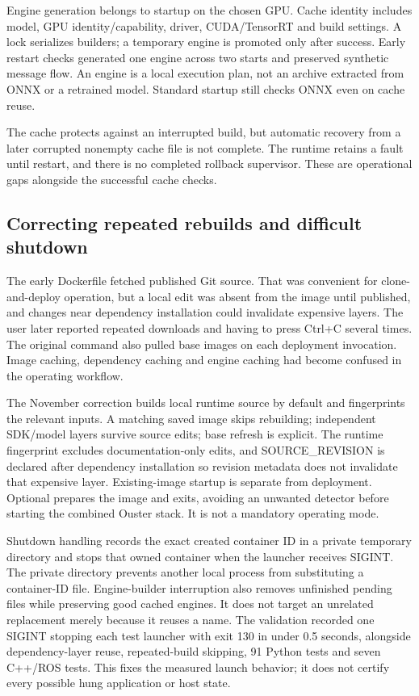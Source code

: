 \documentclass[11pt,a4paper]{article}
\newcommand{\code}[1]{\texttt{\detokenize{#1}}}
\begin{document}
Engine generation belongs to startup on the chosen GPU. Cache identity includes model, GPU identity/capability, driver, CUDA/TensorRT and build settings. A lock serializes builders; a temporary engine is promoted only after success. Early restart checks generated one engine across two starts and preserved synthetic message flow. An engine is a local execution plan, not an archive extracted from ONNX or a retrained model. Standard startup still checks ONNX even on cache reuse.

The cache protects against an interrupted build, but automatic recovery from a later corrupted nonempty cache file is not complete. The runtime retains a fault until restart, and there is no completed rollback supervisor. These are operational gaps alongside the successful cache checks.

\subsection{Correcting repeated rebuilds and difficult shutdown}

The early Dockerfile fetched published Git source. That was convenient for clone-and-deploy operation, but a local edit was absent from the image until published, and changes near dependency installation could invalidate expensive layers. The user later reported repeated downloads and having to press Ctrl+C several times. The original command also pulled base images on each deployment invocation. Image caching, dependency caching and engine caching had become confused in the operating workflow.

The November correction builds local runtime source by default and fingerprints the relevant inputs. A matching saved image skips rebuilding; independent SDK/model layers survive source edits; base refresh is explicit. The runtime fingerprint excludes documentation-only edits, and SOURCE\_REVISION is declared after dependency installation so revision metadata does not invalidate that expensive layer. Existing-image startup is separate from deployment. Optional \code{PP_BUILD_ONLY=1} prepares the image and exits, avoiding an unwanted detector before starting the combined Ouster stack. It is not a mandatory operating mode.

Shutdown handling records the exact created container ID in a private temporary directory and stops that owned container when the launcher receives SIGINT. The private directory prevents another local process from substituting a container-ID file. Engine-builder interruption also removes unfinished pending files while preserving good cached engines. It does not target an unrelated replacement merely because it reuses a name. The validation recorded one SIGINT stopping each test launcher with exit 130 in under 0.5 seconds, alongside dependency-layer reuse, repeated-build skipping, 91 Python tests and seven C++/ROS tests. This fixes the measured launch behavior; it does not certify every possible hung application or host state.
\end{document}
